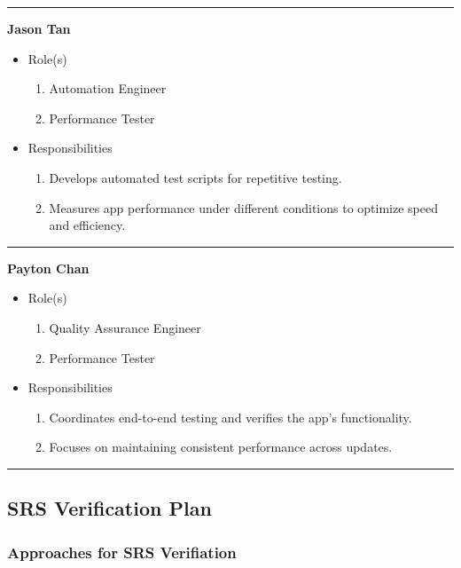 \documentclass[12pt, titlepage]{article}
\begin{document}
\hrule
\vspace{10pt}

\textbf{Jason Tan}
\begin{itemize}
	\item Role(s)
	\begin{enumerate}
		\item Automation Engineer
		\item Performance Tester
	\end{enumerate}
	\item Responsibilities
	\begin{enumerate}
		\item Develops automated test scripts for repetitive testing.
		\item Measures app performance under different conditions to optimize speed and efficiency.
	\end{enumerate}
\end{itemize}

\hrule
\vspace{10pt}

\textbf{Payton Chan}
\begin{itemize}
	\item Role(s)
	\begin{enumerate}
		\item Quality Assurance Engineer
		\item Performance Tester
	\end{enumerate}
	\item Responsibilities
	\begin{enumerate}
		\item Coordinates end-to-end testing and verifies the app's functionality.
		\item Focuses on maintaining consistent performance across updates.
	\end{enumerate}
\end{itemize}

\hrule
\vspace{10pt}

\subsection{SRS Verification Plan}

\subsubsection{Approaches for SRS Verifiation}
\end{document}
